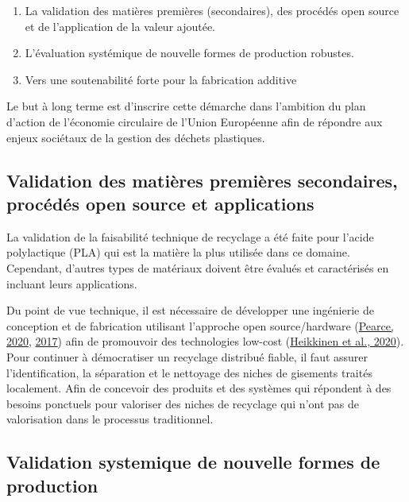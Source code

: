 \documentclass[
  12pt,
  oneside]{book}
\providecommand{\tightlist}{%
  \setlength{\itemsep}{0pt}\setlength{\parskip}{0pt}}
\begin{document}
\begin{enumerate}
\def\labelenumi{\arabic{enumi}.}
\tightlist
\item
  La validation des matières premières (secondaires), des procédés open source et de l'application de la valeur ajoutée.
\item
  L'évaluation systémique de nouvelle formes de production robustes.
\item
  Vers une soutenabilité forte pour la fabrication additive
\end{enumerate}

Le but à long terme est d'inscrire cette démarche dans l'ambition du plan d'action de l'économie circulaire de l'Union Européenne afin de répondre aux enjeux sociétaux de la gestion des déchets plastiques.

\hypertarget{validation-des-matiuxe8res-premiuxe8res-secondaires-procuxe9duxe9s-open-source-et-applications}{%
\subsection{Validation des matières premières secondaires, procédés open source et applications}\label{validation-des-matiuxe8res-premiuxe8res-secondaires-procuxe9duxe9s-open-source-et-applications}}

La validation de la faisabilité technique de recyclage a été faite pour l'acide polylactique (PLA) qui est la matière la plus utilisée dans ce domaine. Cependant, d'autres types de matériaux doivent être évalués et caractérisés en incluant leurs applications.

Du point de vue technique, il est nécessaire de développer une ingénierie de conception et de fabrication utilisant l'approche open source/hardware (\protect\hyperlink{ref-Pearce2020a}{Pearce, 2020}, \protect\hyperlink{ref-Pearce2017b}{2017}) afin de promouvoir des technologies low-cost (\protect\hyperlink{ref-Heikkinen2020a}{Heikkinen et al., 2020}). Pour continuer à démocratiser un recyclage distribué fiable, il faut assurer l'identification, la séparation et le nettoyage des niches de gisements traités localement. Afin de concevoir des produits et des systèmes qui répondent à des besoins ponctuels pour valoriser des niches de recyclage qui n'ont pas de valorisation dans le processus traditionnel.

\hypertarget{validation-systemique-de-nouvelle-formes-de-production}{%
\subsection{Validation systemique de nouvelle formes de production}\label{validation-systemique-de-nouvelle-formes-de-production}}
\end{document}
